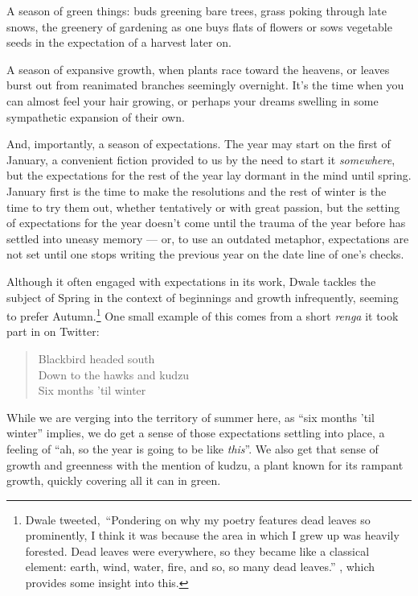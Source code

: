 \documentclass[12pt,oneside]{memoir}
\begin{document}
A season of green things: buds greening bare trees, grass poking through late snows, the greenery of gardening as one buys flats of flowers or sows vegetable seeds in the expectation of a harvest later on.

A season of expansive growth, when plants race toward the heavens, or leaves burst out from reanimated branches seemingly overnight. It's the time when you can almost feel your hair growing, or perhaps your dreams swelling in some sympathetic expansion of their own.

And, importantly, a season of expectations. The year may start on the first of January, a convenient fiction provided to us by the need to start it \emph{somewhere}, but the expectations for the rest of the year lay dormant in the mind until spring. January first is the time to make the resolutions and the rest of winter is the time to try them out, whether tentatively or with great passion, but the setting of expectations for the year doesn't come until the trauma of the year before has settled into uneasy memory --- or, to use an outdated metaphor, expectations are not set until one stops writing the previous year on the date line of one's checks.

Although it often engaged with expectations in its work, Dwale tackles the subject of Spring in the context of beginnings and growth infrequently, seeming to prefer Autumn.\footnote{Dwale tweeted,\footnotemark~``Pondering on why my poetry features dead leaves so prominently, I think it was because the area in which I grew up was heavily forested. Dead leaves were everywhere, so they became like a classical element: earth, wind, water, fire, and so, so many dead leaves.'' \parencite{dwale_leaves_tweet}, which provides some insight into this.} One small example of this comes from a short \emph{renga} it took part in on Twitter:

\begin{verse}
Blackbird headed south\\
Down to the hawks and kudzu\\
Six months 'til winter

\parencite{dwale_haiku}
\end{verse}

While we are verging into the territory of summer here, as ``six months 'til winter'' implies, we do get a sense of those expectations settling into place, a feeling of ``ah, so the year is going to be like \emph{this}''. We also get that sense of growth and greenness with the mention of kudzu, a plant known for its rampant growth, quickly covering all it can in green.
\end{document}
